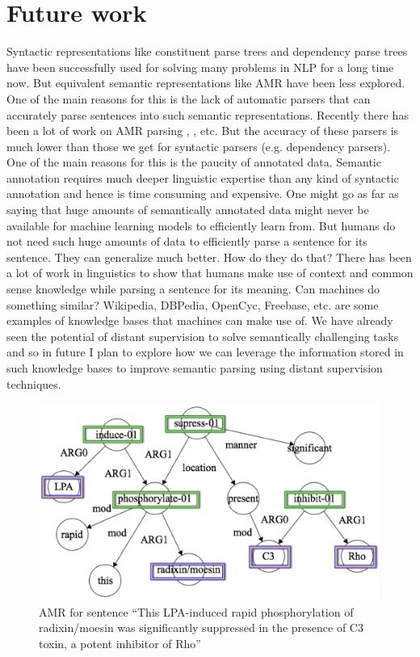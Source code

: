 \documentclass[11pt,a4paper]{article}
\begin{document}
\section{Future work}
Syntactic representations like constituent parse trees and dependency parse trees have been successfully used for solving many problems in NLP for a long time now. But equivalent semantic representations like AMR have been less explored. One of the main reasons for this is the lack of automatic parsers that can accurately parse sentences into such semantic representations. Recently there has been a lot of work on AMR parsing \cite{flanigan-EtAl:2014:P14-1}, \cite{pust2015using}, etc. But the accuracy of these parsers is much lower than those we get for syntactic parsers (e.g. dependency parsers). One of the main reasons for this is the paucity of annotated data. Semantic annotation requires much deeper linguistic expertise than any kind of syntactic annotation and hence is time consuming and expensive. One might go as far as saying that huge amounts of semantically annotated data might never be available for machine learning models to efficiently learn from. But humans do not need such huge amounts of data to efficiently parse a sentence for its sentence. They can generalize much better. How do they do that? There has been a lot of work in linguistics to show that humans make use of context and common sense knowledge while parsing a sentence for its meaning. Can machines do something similar? Wikipedia, DBPedia, OpenCyc, Freebase, etc. are some examples of knowledge bases that machines can make use of. We have already seen the potential of distant supervision to solve semantically challenging tasks and so in future I plan to explore how we can leverage the information stored in such knowledge bases to improve semantic parsing using distant supervision techniques.

\begin{figure}
\centering
\includegraphics[width = .5\textwidth]{EgAMR}
\caption{AMR for sentence ``This LPA-induced rapid phosphorylation of radixin/moesin was significantly suppressed in the presence of C3 toxin, a potent inhibitor of Rho''}
\label{amr_eg}
\end{figure}
\end{document}
